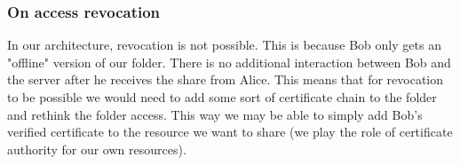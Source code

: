 \subsubsection{On access revocation}
In our architecture, revocation is not possible. This is because Bob only gets an "offline" version of our folder. There is no additional interaction between Bob and the server after he receives the share from Alice. This means that for revocation to be possible we would need to add some sort of certificate chain to the folder and rethink the folder access. This way we may be able to simply add Bob's verified certificate to the resource we want to share (we play the role of certificate authority for our own resources).